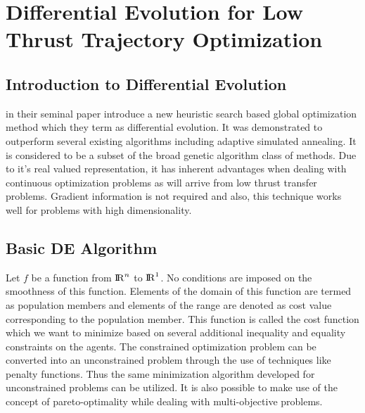 \chapter{Differential Evolution for Low Thrust Trajectory Optimization} 
\label{AppendixA}
\ifpdf
\graphicspath{{Appendix1/}{Appendix1/}{Appendix1/}}
\else
\graphicspath{{Appendix1/}{Appendix1/}}
\fi
\section{Introduction to Differential Evolution}
\cite{storn_differential_1997} in their seminal paper introduce a new heuristic search based global optimization method which they term as differential evolution. It was demonstrated to outperform several existing algorithms including adaptive simulated annealing. It is considered to be a subset of the broad genetic algorithm class of methods. Due to it’s real valued representation, it has inherent advantages when dealing with continuous optimization problems as will arrive from low thrust transfer problems. Gradient information is not required and also, this technique works well for problems with high dimensionality. 

\section{Basic DE Algorithm}
Let $f$ be a function from ${\rm I\!R}^{n}$ to ${\rm I\!R}^{1}$. No conditions are imposed on the smoothness of this function. Elements of the domain of this function are termed as population members and elements of the range are denoted as cost value corresponding to the population member. This function is called the cost function which we want to minimize based on several additional inequality and equality constraints on the agents. The constrained optimization problem can be converted into an unconstrained problem through the use of techniques like penalty functions. Thus the same minimization algorithm developed for unconstrained problems can be utilized. It is also possible to make use of the concept of pareto-optimality while dealing with multi-objective problems.\\

